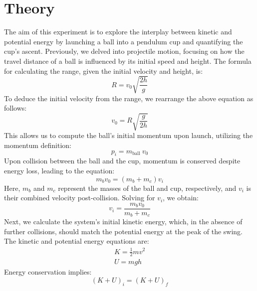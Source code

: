 \documentclass{report}
\begin{document}
    \section{Theory}
    \bigbreak \noindent 
    The aim of this experiment is to explore the interplay between kinetic and potential energy by launching a ball into a pendulum cup and quantifying the cup's ascent. Previously, we delved into projectile motion, focusing on how the travel distance of a ball is influenced by its initial speed and height. The formula for calculating the range, given the initial velocity and height, is:
    \begin{equation}
        R=v_0 \sqrt{\frac{2 h}{g}}
    \end{equation}
    \bigbreak \noindent
    To deduce the initial velocity from the range, we rearrange the above equation as follows:
    \begin{equation}
        v_0=R \sqrt{\frac{g}{2 h}}
    \end{equation}
    \bigbreak \noindent
    This allows us to compute the ball's initial momentum upon launch, utilizing the momentum definition:
    \begin{equation}
        p_i=m_{\text {ball }} v_0
    \end{equation}
    \bigbreak \noindent
    Upon collision between the ball and the cup, momentum is conserved despite energy loss, leading to the equation:
    \begin{equation}
        m_b v_0=\left(m_b+m_c\right) v_i
    \end{equation}
    \bigbreak \noindent
    Here, $m_b$ and $m_c$ represent the masses of the ball and cup, respectively, and $v_i$ is their combined velocity post-collision. Solving for $v_i$, we obtain:
    \begin{equation}
        v_i=\frac{m_b v_0}{m_b+m_c}
    \end{equation}
    \bigbreak \noindent
    Next, we calculate the system's initial kinetic energy, which, in the absence of further collisions, should match the potential energy at the peak of the swing. The kinetic and potential energy equations are:
    \begin{equation}
        \begin{split}
            K=\frac{1}{2} m v^2 \\
            U=m g h
        \end{split}
    \end{equation}
    \bigbreak \noindent
    Energy conservation implies:
    \begin{equation}
        (K+U)_i=(K+U)_f
    \end{equation}
\end{document}
